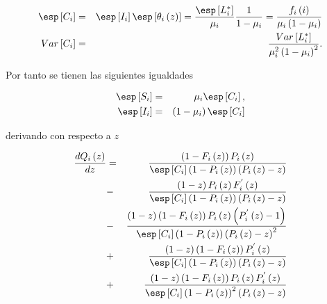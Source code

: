 \begin{eqnarray*}
\esp\left[C_{i}\right]&=&\esp\left[I_{i}\right]\esp\left[\theta_{i}\left(z\right)\right]=\frac{\esp\left[L_{i}^{*}\right]}{\mu_{i}}\frac{1}{1-\mu_{i}}=\frac{f_{i}\left(i\right)}{\mu_{i}\left(1-\mu_{i}\right)}\\
Var\left[C_{i}\right]&=&\frac{Var\left[L_{i}^{*}\right]}{\mu_{i}^{2}\left(1-\mu_{i}\right)^{2}}.
\end{eqnarray*}

Por tanto se tienen las siguientes igualdades


\begin{eqnarray*}
\esp\left[S_{i}\right]&=&\mu_{i}\esp\left[C_{i}\right],\\
\esp\left[I_{i}\right]&=&\left(1-\mu_{i}\right)\esp\left[C_{i}\right]\\
\end{eqnarray*}

derivando con respecto a $z$



\begin{eqnarray*}
\frac{d Q_{i}\left(z\right)}{d z}&=&\frac{\left(1-F_{i}\left(z\right)\right)P_{i}\left(z\right)}{\esp\left[C_{i}\right]\left(1-P_{i}\left(z\right)\right)\left(P_{i}\left(z\right)-z\right)}\\
&-&\frac{\left(1-z\right)P_{i}\left(z\right)F_{i}^{'}\left(z\right)}{\esp\left[C_{i}\right]\left(1-P_{i}\left(z\right)\right)\left(P_{i}\left(z\right)-z\right)}\\
&-&\frac{\left(1-z\right)\left(1-F_{i}\left(z\right)\right)P_{i}\left(z\right)\left(P_{i}^{'}\left(z\right)-1\right)}{\esp\left[C_{i}\right]\left(1-P_{i}\left(z\right)\right)\left(P_{i}\left(z\right)-z\right)^{2}}\\
&+&\frac{\left(1-z\right)\left(1-F_{i}\left(z\right)\right)P_{i}^{'}\left(z\right)}{\esp\left[C_{i}\right]\left(1-P_{i}\left(z\right)\right)\left(P_{i}\left(z\right)-z\right)}\\
&+&\frac{\left(1-z\right)\left(1-F_{i}\left(z\right)\right)P_{i}\left(z\right)P_{i}^{'}\left(z\right)}{\esp\left[C_{i}\right]\left(1-P_{i}\left(z\right)\right)^{2}\left(P_{i}\left(z\right)-z\right)}
\end{eqnarray*}


